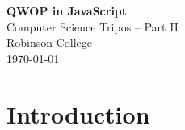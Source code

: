 \documentclass[12pt,a4paper,twoside,openright]{report}
\begin{document}


\pagestyle{empty}


\vspace*{60mm}
\begin{center}
\Huge
\textbf{QWOP in JavaScript} \\[5mm]
Computer Science Tripos -- Part II \\[5mm]
Robinson College \\[5mm]
\today  %
\end{center}






\chapter{Introduction}
\end{document}
